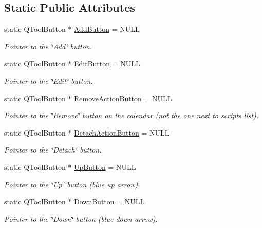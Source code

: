 \subsection*{Static Public Attributes}
\begin{DoxyCompactItemize}
\item 
static Q\-Tool\-Button $\ast$ \hyperlink{struct_calendar_tools_a0ebec6f50027e7bcaa0a7222517c0ec6}{Add\-Button} = N\-U\-L\-L
\begin{DoxyCompactList}\small\item\em Pointer to the \char`\"{}\-Add\char`\"{} button. \end{DoxyCompactList}\item 
static Q\-Tool\-Button $\ast$ \hyperlink{struct_calendar_tools_a9104f9618315fc0072bc3004010e5aa4}{Edit\-Button} = N\-U\-L\-L
\begin{DoxyCompactList}\small\item\em Pointer to the \char`\"{}\-Edit\char`\"{} button. \end{DoxyCompactList}\item 
static Q\-Tool\-Button $\ast$ \hyperlink{struct_calendar_tools_ab68a7129df2c2d873265d2205bd94de1}{Remove\-Action\-Button} = N\-U\-L\-L
\begin{DoxyCompactList}\small\item\em Pointer to the \char`\"{}\-Remove\char`\"{} button on the calendar (not the one next to scripts list). \end{DoxyCompactList}\item 
static Q\-Tool\-Button $\ast$ \hyperlink{struct_calendar_tools_a4c4ae188d97622a4da7b1b0c47f7629d}{Detach\-Action\-Button} = N\-U\-L\-L
\begin{DoxyCompactList}\small\item\em Pointer to the \char`\"{}\-Detach\char`\"{} button. \end{DoxyCompactList}\item 
static Q\-Tool\-Button $\ast$ \hyperlink{struct_calendar_tools_a63d3c0ee2fe25cad5f813d23b7dd2a16}{Up\-Button} = N\-U\-L\-L
\begin{DoxyCompactList}\small\item\em Pointer to the \char`\"{}\-Up\char`\"{} button (blue up arrow). \end{DoxyCompactList}\item 
static Q\-Tool\-Button $\ast$ \hyperlink{struct_calendar_tools_a9a5b20ba0477c0debcf109039d929eb0}{Down\-Button} = N\-U\-L\-L
\begin{DoxyCompactList}\small\item\em Pointer to the \char`\"{}\-Down\char`\"{} button (blue down arrow). \end{DoxyCompactList}\item 

\end{DoxyCompactItemize}
